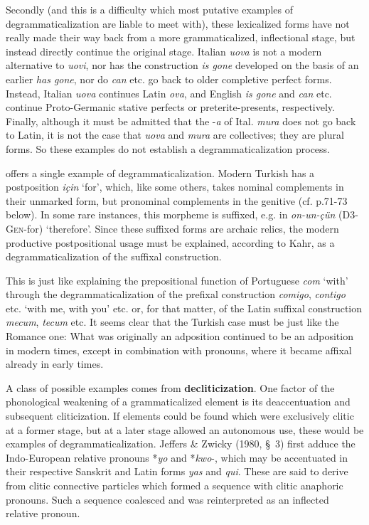 Secondly (and this is a difficulty which most putative examples of degrammaticalization are liable to meet with), these lexicalized forms have not really made their way back from a more grammaticalized, inflectional stage, but instead directly continue the original stage. Italian \textit{uova} is not a modern alternative to \textit{uovi}, nor has the construction \textit{is gone} developed on the basis of an earlier \textit{has gone}, nor do \textit{can} etc. go back to older completive perfect forms. Instead, Italian \textit{uova} continues Latin \textit{ova}, and English \textit{is gone} and \textit{can} etc. continue Proto-Germanic stative perfects or preterite-presents, respectively. Finally, although it must be admitted that the -\textit{a} of Ital. \textit{mura} does not go back to Latin, it is not the case that \textit{uova} and \textit{mura} are collectives; they are plural forms. So these examples do not establish a degrammaticalization process.

\citet[122]{Kahr1976} offers a single example of degrammaticalization. Modern Turkish has a postposition \textit{için} ‘for’, which, like some others, takes nominal complements in their unmarked form, but pronominal complements in the genitive (cf. p.71-73 below). In some rare instances, this morpheme is suffixed, e.g. in \textit{on-un-çün} (D3-\textsc{Gen}{}-for) ‘therefore’. Since these suffixed forms are archaic relics, the modern productive postpositional usage must be explained, according to Kahr, as a degrammaticalization of the suffixal construction.

This is just like explaining the prepositional function of Portuguese \textit{com} ‘with’ through the degrammaticalization of the prefixal construction \textit{comigo}, \textit{contigo} etc. ‘with me, with you’ etc. or, for that matter, of the Latin suffixal construction \textit{mecum}, \textit{tecum} etc. It seems clear that the Turkish case must be just like the Romance one: What was originally an adposition continued to be an adposition in modern times, except in combination with pronouns, where it became affixal already in early times.

A class of possible examples comes from \textbf{decliticization}. One factor of the phonological weakening of a grammaticalized element is its deaccentuation and subsequent cliticization. If elements could be found which were exclusively clitic at a former stage, but at a later stage allowed an autonomous use, these would be examples of degrammaticalization. Jeffers \& Zwicky (1980, §~3) first adduce the Indo-European relative pronouns *\textit{yo} and *\textit{kwo}{}-, which may be accentuated in their respective Sanskrit and Latin forms \textit{yas} and \textit{qui}. These are said to derive from clitic connective particles which formed a sequence with clitic anaphoric pronouns. Such a sequence coalesced and was reinterpreted as an inflected relative pronoun.

